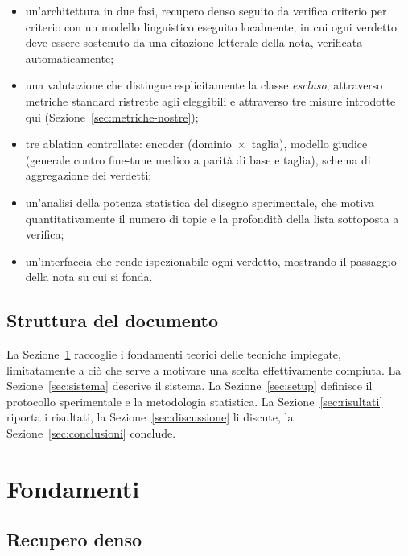 \documentclass[pdflatex,sn-mathphys-num]{sn-jnl}
\theoremstyle{thmstyleone}
\theoremstyle{thmstyletwo}
\theoremstyle{thmstylethree}
\begin{document}
\begin{itemize}
  \item un'architettura in due fasi, recupero denso seguito da verifica criterio per criterio con un modello linguistico eseguito localmente, in cui ogni verdetto deve essere sostenuto da una citazione letterale della nota, verificata automaticamente;
  \item una valutazione che distingue esplicitamente la classe \emph{escluso}, attraverso metriche standard ristrette agli eleggibili e attraverso tre misure introdotte qui (Sezione~\ref{sec:metriche-nostre});
  \item tre ablation controllate: encoder (dominio~$\times$~taglia), modello giudice (generale contro fine-tune medico a parità di base e taglia), schema di aggregazione dei verdetti;
  \item un'analisi della potenza statistica del disegno sperimentale, che motiva quantitativamente il numero di topic e la profondità della lista sottoposta a verifica;
  \item un'interfaccia che rende ispezionabile ogni verdetto, mostrando il passaggio della nota su cui si fonda.
\end{itemize}

\subsection{Struttura del documento}\label{sec:struttura}

La Sezione~\ref{sec:fondamenti} raccoglie i fondamenti teorici delle tecniche impiegate, limitatamente a ciò che serve a motivare una scelta effettivamente compiuta. La Sezione~\ref{sec:sistema} descrive il sistema. La Sezione~\ref{sec:setup} definisce il protocollo sperimentale e la metodologia statistica. La Sezione~\ref{sec:risultati} riporta i risultati, la Sezione~\ref{sec:discussione} li discute, la Sezione~\ref{sec:conclusioni} conclude.

\section{Fondamenti}\label{sec:fondamenti}

\subsection{Recupero denso}\label{sec:denso}
\end{document}
